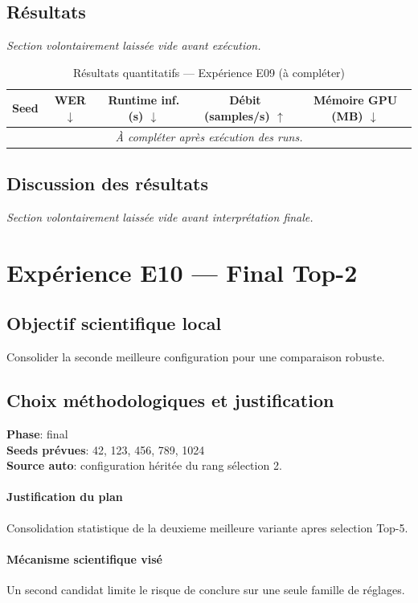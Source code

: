 \documentclass[11pt,a4paper]{article}
\begin{document}
\subsection{Résultats}
\textit{Section volontairement laissée vide avant exécution.}

\begin{table}[H]
\centering
\caption{Résultats quantitatifs --- Expérience E09 (à compléter)}
\begin{tabular}{lcccc}
\toprule
Seed & WER $\downarrow$ & Runtime inf. (s) $\downarrow$ & Débit (samples/s) $\uparrow$ & Mémoire GPU (MB) $\downarrow$ \\
\midrule
\multicolumn{5}{c}{\textit{À compléter après exécution des runs.}} \\
\bottomrule
\end{tabular}
\end{table}

\subsection{Discussion des résultats}
\textit{Section volontairement laissée vide avant interprétation finale.}


\section{Expérience E10 --- Final Top-2}
\subsection{Objectif scientifique local}
Consolider la seconde meilleure configuration pour une comparaison robuste.

\subsection{Choix méthodologiques et justification}
\textbf{Phase}: final\\
\textbf{Seeds prévues}: 42, 123, 456, 789, 1024\\
\textbf{Source auto}: configuration héritée du rang sélection 2.

\paragraph{Justification du plan}
Consolidation statistique de la deuxieme meilleure variante apres selection Top-5.

\paragraph{Mécanisme scientifique visé}
Un second candidat limite le risque de conclure sur une seule famille de réglages.
\end{document}
